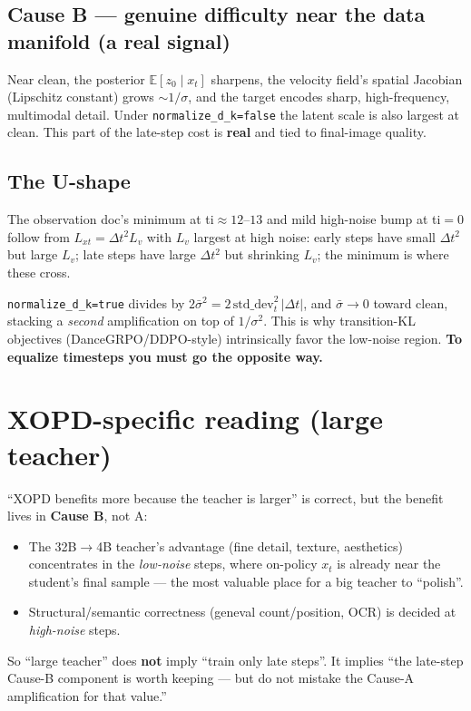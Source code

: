 \documentclass[11pt,a4paper]{article}
\newcommand{\E}{\mathbb{E}}
\newcommand{\dt}{\Delta t}
\begin{document}
\subsection{Cause B --- genuine difficulty near the data manifold (a real signal)}
\label{ssec:causeB}

Near clean, the posterior $\E[z_0\mid x_t]$ sharpens, the velocity field's spatial Jacobian
(Lipschitz constant) grows $\sim 1/\sigma$, and the target encodes sharp, high-frequency, multimodal
detail. Under \texttt{normalize\_d\_k=false} the latent scale is also largest at clean. This part of
the late-step cost is \textbf{real} and tied to final-image quality.

\subsection{The U-shape}
\label{ssec:ushape}

The observation doc's minimum at ti$\approx12$--$13$ and mild high-noise bump at ti$=0$ follow from
$L_{xt}=\dt^2 L_v$ with $L_v$ largest at high noise: early steps have small $\dt^2$ but large $L_v$;
late steps have large $\dt^2$ but shrinking $L_v$; the minimum is where these cross.

\begin{tcolorbox}[colback=red!5,colframe=red!50!black,title=\textbf{Corollary: \texttt{normalize\_d\_k=true} makes it worse, not better}]
\texttt{normalize\_d\_k=true} divides by $2\bar\sigma^2=2\,\mathrm{std\_dev}_t^2\,\lvert\dt\rvert$,
and $\bar\sigma\to0$ toward clean, stacking a \emph{second} amplification on top of $1/\sigma^2$.
This is why transition-KL objectives (DanceGRPO/DDPO-style) intrinsically favor the low-noise
region. \textbf{To equalize timesteps you must go the opposite way.}
\end{tcolorbox}

\section{XOPD-specific reading (large teacher)}
\label{sec:xopd}

``XOPD benefits more because the teacher is larger'' is correct, but the benefit lives in
\textbf{Cause B}, not A:
\begin{itemize}[leftmargin=1.5em]
\item The 32B$\to$4B teacher's advantage (fine detail, texture, aesthetics) concentrates in the
\emph{low-noise} steps, where on-policy $x_t$ is already near the student's final sample --- the most
valuable place for a big teacher to ``polish''.
\item Structural/semantic correctness (geneval count/position, OCR) is decided at \emph{high-noise}
steps.
\end{itemize}
So ``large teacher'' does \textbf{not} imply ``train only late steps''. It implies ``the late-step
Cause-B component is worth keeping --- but do not mistake the Cause-A amplification for that value.''
\end{document}
